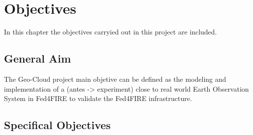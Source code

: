 \chapter{Objectives}
\label{chap:objetivos}
In this chapter the objectives carryied out in this project are included.

\section{General Aim}

The Geo-Cloud project main objetive can be defined as the modeling and
implementation of a (antes -> experiment) close to real world Earth Observation System in Fed4FIRE to validate the Fed4FIRE infrastructure.

\section{Specifical Objectives}

